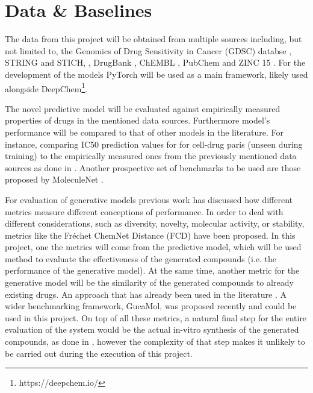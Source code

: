 \documentclass{article}
\begin{document}
    \section*{Data \& Baselines}

The data from this project will be obtained from multiple sources including, but not
limited to, the Genomics of Drug Sensitivity in Cancer (GDSC) databse \cite{Yang2013},
STRING and STICH, \cite{Szklarczyk2019,Szklarczyk2016}, DrugBank \cite{Wishart2006},
ChEMBL \cite{Gaulton2017}, PubChem \cite{Kim2019} and ZINC 15 \cite{Sterling2015}. For
the development of the models PyTorch \cite{Paszke2019} will be used as a main
framework, likely used alongside DeepChem\footnote{https://deepchem.io/}.

The novel predictive model will be evaluated against empirically measured properties of
drugs in the mentioned data sources. Furthermore model's performance will be compared to
that of other models in the literature. For instance, comparing IC50 prediction values
for for cell-drug paris (unseen during training) to the empirically measured ones from
the previously mentioned data sources as done in \cite{Oskooei2019, Joo2019,
Oskooei2018}. Another prospective set of benchmarks to be used are those proposed by
MoleculeNet \cite{Wu2018}.

For evaluation of generative models previous work \cite{Theis2016} has discussed how
different metrics measure different conceptions of performance. In order to deal with
different considerations, such as diversity, novelty, molecular activity, or stability,
metrics like the Fréchet ChemNet Distance (FCD) \cite{Preuer} have been proposed. In
this project, one the metrics will come from the predictive model, which will be used
method to evaluate the effectiveness of the generated compounds (i.e. the performance of
the generative model). At the same time, another metric for the generative model will be
the similarity of the generated compounds to already existing drugs. An approach that
has already been used in the literature \cite{Born2019}. A wider benchmarking framework,
GucaMol, was proposed recently \cite{Brown2019} and could be used in this project. On
top of all these metrics, a natural final step for the entire evaluation of the system
would be the actual in-vitro synthesis of the generated compounds, as done in
\cite{Zhavoronkov2019}, however the complexity of that step makes it unlikely to be
carried out during the execution of this project. 
\end{document}
